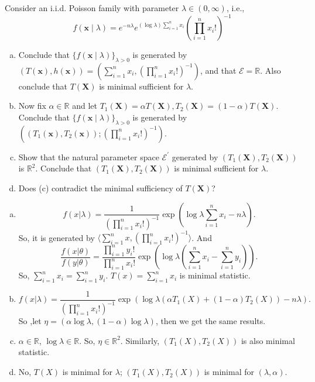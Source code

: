 \begin{exercise}
    Consider an i.i.d. Poisson family with parameter \(\lambda \in(0, \infty)\), i.e.,
    \[
        f(\mathbf{x} \mid \lambda)=e^{-n \lambda} e^{(\log \lambda) \sum_{i=1}^{n} x_{i}}\left(\prod_{i=1}^{n} x_{i} !\right)^{-1}
    \]
    \begin{enumerate}[(a)]
        \item Conclude that \(\{f(\mathbf{x} \mid \lambda)\}_{\lambda>0}\) is generated by \((T(\mathbf{x}), h(\mathbf{x}))=\left(\sum_{i=1}^{n} x_{i},\left(\prod_{i=1}^{n} x_{i} !\right)^{-1}\right)\), and that \(\mathcal{E}=\mathbb{R}\). Also conclude that \(T(\mathbf{X})\) is minimal sufficient for \(\lambda\). 
        \item Now fix \(\alpha \in \mathbb{R}\) and let \(T_{1}(\mathbf{X})=\alpha T(\mathbf{X}), T_{2}(\mathbf{X})=(1-\alpha) T(\mathbf{X})\). Conclude that \(\{f(\mathbf{x} \mid \lambda)\}_{\lambda>0}\) is generated by \(\left(\left(T_{1}(\mathbf{x}), T_{2}(\mathbf{x})\right) ;\left(\prod_{i=1}^{n} x_{i} !\right)^{-1}\right)\). 
        \item Show that the natural parameter space \(\mathcal{E}^{\prime}\) generated by \(\left(T_{1}(\mathbf{X}), T_{2}(\mathbf{X})\right)\) is \(\mathbb{R}^{2}\). Conclude that \(\left(T_{1}(\mathbf{X}), T_{2}(\mathbf{X})\right)\) is minimal sufficient for \(\lambda\). 
        \item Does (c) contradict the minimal sufficiency of \(T(\mathbf{X})\)? 
    \end{enumerate}
\end{exercise}

\begin{solution}
    \begin{enumerate}[(a)]
        \item \[
                f(x|\lambda)=\frac{1}{(\prod_{i=1}^nx_i!)^{-1}}\exp\left(\log{\lambda} \sum_{i=1}^nx_i-n\lambda\right). 
            \]
            So, it is generated by $\langle \sum_{i=1}^nx, (\prod_{i=1}^nx_i!)^{-1} \rangle$. And 
            \[
                \frac{f(x|\theta)}{f(y|\theta)} = \frac{\prod_{i=1}^ny_i!}{\prod_{i=1}^nx_i!}\exp\left(\log\lambda\left(\sum_{i=1}^n x_i-\sum_{i=1}^n y_i\right)\right). 
            \]
            So, $\sum_{i=1}^n x_i=\sum_{i=1}^n y_i$. $T(x)=\sum_{i=1}^n x_i$ is minimal statistic. 
        \item \[
            f(x|\lambda)=\frac{1}{(\prod_{i=1}^nx_i!)^{-1}}\exp\left(\log{\lambda} (\alpha T_1(X)+(1-\alpha)T_2(X)) - n\lambda\right). 
        \]
        So ,let $\eta=(\alpha\log\lambda, (1-\alpha)\log\lambda)$, then we get the same results. 
        \item $\alpha\in\mathbb{R}$, $\log\lambda\in\mathbb{R}$. So, $\eta\in\mathbb{R}^2$. Similarly, $(T_1(X),T_2(X))$ is also minimal statistic. 
        \item No, $T(X)$ is minimal for $\lambda$; $(T_1(X), T_2(X))$ is minimal for $(\lambda, \alpha)$. 
    \end{enumerate}
    
\end{solution}
